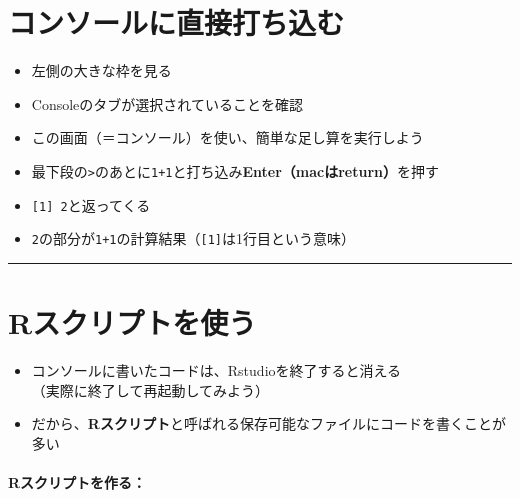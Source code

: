 \documentclass[
]{book}
\providecommand{\tightlist}{%
  \setlength{\itemsep}{0pt}\setlength{\parskip}{0pt}}
\begin{document}
\hypertarget{ux30b3ux30f3ux30bdux30fcux30ebux306bux76f4ux63a5ux6253ux3061ux8fbcux3080}{%
\section{コンソールに直接打ち込む}\label{ux30b3ux30f3ux30bdux30fcux30ebux306bux76f4ux63a5ux6253ux3061ux8fbcux3080}}

\begin{itemize}
\tightlist
\item
  左側の大きな枠を見る\\
\item
  Consoleのタブが選択されていることを確認
\item
  この画面（＝コンソール）を使い、簡単な足し算を実行しよう
\item
  最下段の\texttt{\textgreater{}}のあとに\texttt{1+1}と打ち込み\textbf{Enter（macはreturn）}を押す
\item
  \texttt{{[}1{]}\ 2}と返ってくる
\item
  \texttt{2}の部分が\texttt{1+1}の計算結果（\texttt{{[}1{]}}は1行目という意味）
\end{itemize}

\begin{center}\rule{0.5\linewidth}{0.5pt}\end{center}

\hypertarget{rux30b9ux30afux30eaux30d7ux30c8ux3092ux4f7fux3046}{%
\section{Rスクリプトを使う}\label{rux30b9ux30afux30eaux30d7ux30c8ux3092ux4f7fux3046}}

\begin{itemize}
\tightlist
\item
  コンソールに書いたコードは、Rstudioを終了すると消える\\
  （実際に終了して再起動してみよう）\\
\item
  だから、\textbf{Rスクリプト}と呼ばれる保存可能なファイルにコードを書くことが多い
\end{itemize}

\hypertarget{rux30b9ux30afux30eaux30d7ux30c8ux3092ux4f5cux308b}{%
\paragraph*{Rスクリプトを作る：}\label{rux30b9ux30afux30eaux30d7ux30c8ux3092ux4f5cux308b}}
\end{document}
